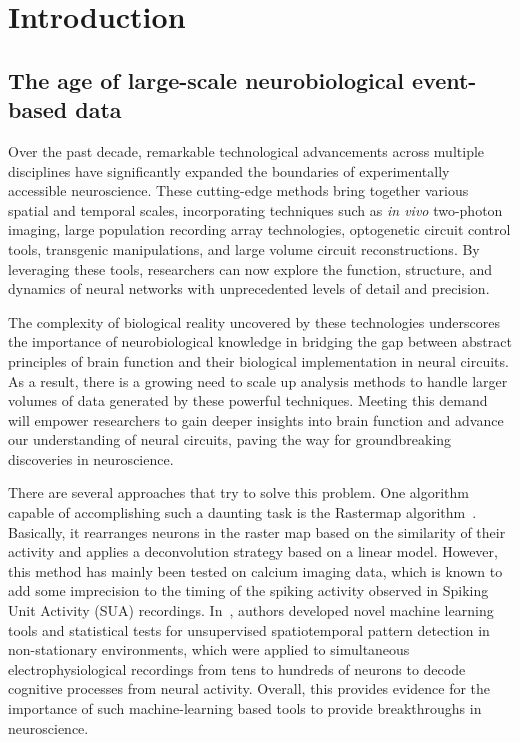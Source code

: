 \documentclass[runningheads]{llncs}
\begin{document}
\section{Introduction}

\subsection{The age of large-scale neurobiological event-based data}
% 
Over the past decade, remarkable technological advancements across multiple disciplines have significantly expanded the boundaries of experimentally accessible neuroscience. These cutting-edge methods bring together various spatial and temporal scales, incorporating techniques such as \textit{in vivo} two-photon imaging, large population recording array technologies, optogenetic circuit control tools, transgenic manipulations, and large volume circuit reconstructions. By leveraging these tools, researchers can now explore the function, structure, and dynamics of neural networks with unprecedented levels of detail and precision.

The complexity of biological reality uncovered by these technologies underscores the importance of neurobiological knowledge in bridging the gap between abstract principles of brain function and their biological implementation in neural circuits. As a result, there is a growing need to scale up analysis methods to handle larger volumes of data generated by these powerful techniques. Meeting this demand will empower researchers to gain deeper insights into brain function and advance our understanding of neural circuits, paving the way for groundbreaking discoveries in neuroscience.

There are several approaches that try to solve this problem. One algorithm capable of accomplishing such a daunting task is the Rastermap algorithm~\cite{pachitariu_robustness_2018}. Basically, it rearranges neurons in the raster map based on the similarity of their activity and applies a deconvolution strategy based on a linear model. However, this method has mainly been tested on calcium imaging data, which is known to add some imprecision to the timing of the spiking activity observed in Spiking Unit Activity (SUA) recordings. In~\cite{russo_cell_2017},  authors developed novel machine learning tools and statistical tests for unsupervised spatiotemporal pattern detection in non-stationary environments, which were applied to simultaneous electrophysiological recordings from tens to hundreds of neurons to decode cognitive processes from neural activity. Overall, this provides evidence for the importance of such machine-learning based tools to provide breakthroughs in neuroscience.
\end{document}
